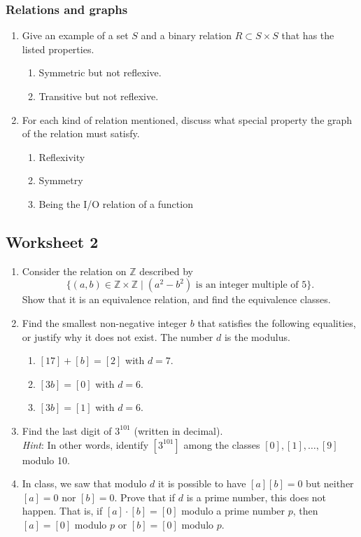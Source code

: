 \documentclass{amsart}
\begin{document}
\subsubsection{Relations and graphs}
\label{sec:org3bdcbee}
\begin{enumerate}
\item Give an example of a set \(S\) and a binary relation \(R \subset S \times S\) that has the listed properties.

\begin{enumerate}
\item Symmetric but not reflexive.

\item Transitive but not reflexive.
\end{enumerate}

\item For each kind of relation mentioned, discuss what special property the graph of the relation must satisfy.
\begin{enumerate}
\item Reflexivity
\item Symmetry
\item Being the I/O relation of a function
\end{enumerate}
\end{enumerate}
\subsection{Worksheet 2}
\label{sec:org3805743}
\togglefalse{solutions}


\begin{enumerate}
\item Consider the relation on \(\mathbb{Z}\) described by
\[\{(a,b) \in \mathbb{Z} \times \mathbb{Z} \mid (a^2 - b^2)\text{ is an integer multiple of }5\}.\]
Show that it is an equivalence relation, and find the equivalence classes.

\item Find the smallest non-negative integer \(b\) that satisfies the following equalities, or justify why it does not exist.
The number \(d\) is the modulus.
\begin{enumerate}
\item \([17] + [b] = [2]\) with \(d = 7\).

\item \([3b] = [0]\) with \(d = 6\).

\item \([3b] = [1]\) with \(d = 6\).
\end{enumerate}

\item Find the last digit of \(3^{101}\) (written in decimal).\\
\emph{Hint}: In other words, identify \([3^{101}]\) among the classes \([0],[1],\dots,[9]\) modulo 10.

\item In class, we saw that modulo \(d\) it is possible to have \([a] [b] = 0\) but neither \([a] = 0\) nor \([b] = 0\).
Prove that if \(d\) is a prime number, this does not happen.
That is, if \([a] \cdot [b] = [0]\) modulo a prime number \(p\), then \([a] = [0]\) modulo \(p\) or \([b] = [0]\) modulo \(p\).
\end{enumerate}
\end{document}
